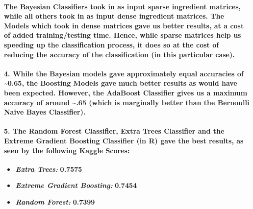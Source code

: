 \documentclass{article}
\begin{document}
\paragraph{The Bayesian Classifiers took in as input sparse ingredient
matrices, while all others took in as input dense ingredient matrices.
The Models which took in dense matrices gave us better results, at a
cost of added training/testing time. Hence, while sparse matrices help
us speeding up the classification process, it does so at the cost of
reducing the accuracy of the classification (in this particular
case).}\label{the-bayesian-classifiers-took-in-as-input-sparse-ingredient-matrices-while-all-others-took-in-as-input-dense-ingredient-matrices.-the-models-which-took-in-dense-matrices-gave-us-better-results-at-a-cost-of-added-trainingtesting-time.-hence-while-sparse-matrices-help-us-speeding-up-the-classification-process-it-does-so-at-the-cost-of-reducing-the-accuracy-of-the-classification-in-this-particular-case.}

\paragraph{4. While the Bayesian models gave approximately equal
accuracies of \textasciitilde{}0.65, the Boosting Models gave much
better results as would have been expected. However, the AdaBoost
Classifier gives us a maximum accuracy of around \textasciitilde{}.65
(which is marginally better than the Bernoulli Naive Bayes
Classifier).}\label{while-the-bayesian-models-gave-approximately-equal-accuracies-of-0.65-the-boosting-models-gave-much-better-results-as-would-have-been-expected.-however-the-adaboost-classifier-gives-us-a-maximum-accuracy-of-around-.65-which-is-marginally-better-than-the-bernoulli-naive-bayes-classifier.}

\paragraph{5. The Random Forest Classifier, Extra Trees Classifier and
the Extreme Gradient Boosting Classifier (in R) gave the best results,
as seen by the following Kaggle
Scores:}\label{the-random-forest-classifier-extra-trees-classifier-and-the-extreme-gradient-boosting-classifier-in-r-gave-the-best-results-as-seen-by-the-following-kaggle-scores}

\begin{itemize}
\tightlist
\item
  \textbf{\emph{Extra Trees:}} \textbf{0.7575}
\item
  \textbf{\emph{Extreme Gradient Boosting:}} \textbf{0.7454}
\item
  \textbf{\emph{Random Forest:}} \textbf{0.7399}
\end{itemize}
\end{document}
